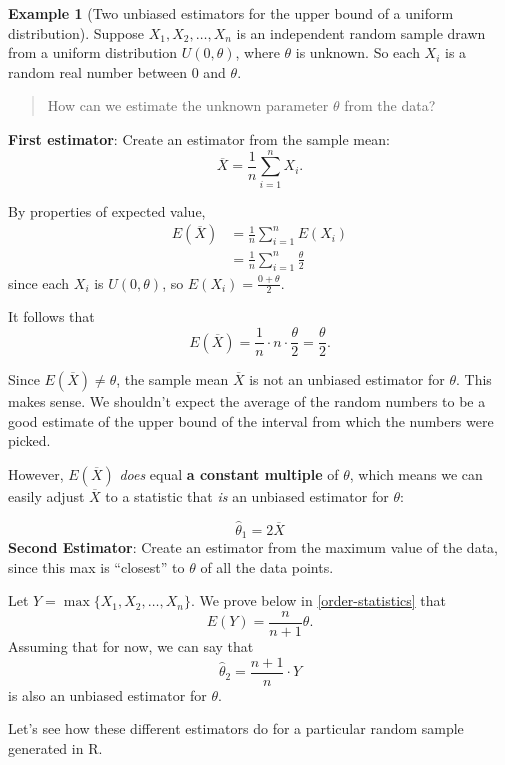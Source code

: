 \documentclass[
]{book}
\theoremstyle{definition}
\theoremstyle{definition}
\newtheorem{example}{Example}[chapter]
\theoremstyle{definition}
\theoremstyle{definition}
\theoremstyle{remark}
\begin{document}
\begin{example}[Two unbiased estimators for the upper bound of a uniform distribution]
Suppose \(X_1, X_2, \ldots, X_n\) is an independent random sample drawn from a uniform distribution \(U(0,\theta)\), where \(\theta\) is unknown.
So each \(X_i\) is a random real number between 0 and \(\theta\).

\begin{quote}
How can we estimate the unknown parameter \(\theta\) from the data?
\end{quote}

\textbf{First estimator}: Create an estimator from the sample mean: \[\overline{X} = \frac{1}{n}\sum_{i = 1}^n X_i.\]

By properties of expected value,
\begin{align*}
E(\overline{X}) &= \frac{1}{n}\sum_{i = 1}^n E(X_i) \\
                &= \frac{1}{n}\sum_{i = 1}^n \frac{\theta}{2}
\end{align*}
since each \(X_i\) is \(U(0,\theta)\), so \(E(X_i) = \frac{0 + \theta}{2}\).

It follows that \[E(\overline{X}) = \frac{1}{n} \cdot n \cdot \frac{\theta}{2} = \frac{\theta}{2}.\]

Since \(E(\overline{X}) \neq \theta\), the sample mean \(\overline{X}\) is not an unbiased estimator for \(\theta\). This makes sense. We shouldn't expect the average of the random numbers to be a good estimate of the upper bound of the interval from which the numbers were picked.

However, \(E(\overline{X})\) \emph{does} equal \textbf{a constant multiple} of \(\theta\), which means we can easily adjust \(\overline{X}\) to a statistic that \emph{is} an unbiased estimator for \(\theta\):

\[\hat{\theta}_1 = 2\overline{X} \tag{unbiased estimator 1}\]
\textbf{Second Estimator}: Create an estimator from the maximum value of the data, since this max is ``closest'' to \(\theta\) of all the data points.

Let \(Y = \max\{X_1, X_2, \ldots, X_n\}.\) We prove below in \ref{order-statistics} that \[E(Y) = \frac{n}{n+1}\theta.\]
Assuming that for now, we can say that \[\hat{\theta}_2 = \frac{n+1}{n}\cdot Y \tag{unbiased estimator 2}\] is also an unbiased estimator for \(\theta\).

Let's see how these different estimators do for a particular random sample generated in R.


\end{example}
\end{document}
